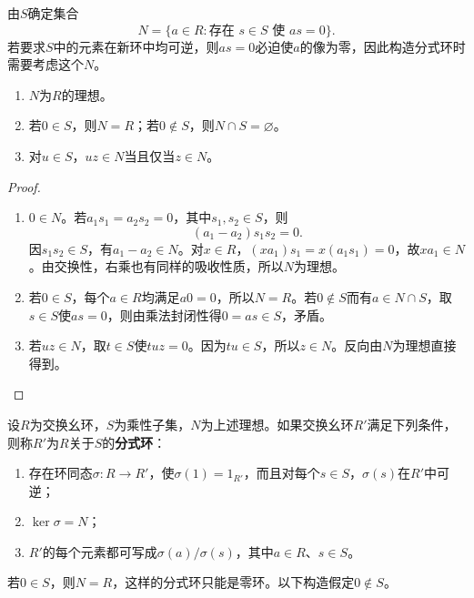 由$S$确定集合
\[
N=\{a\in R:\text{存在 }s\in S\text{ 使 }as=0\}.
\]
若要求$S$中的元素在新环中均可逆，则$as=0$必迫使$a$的像为零，因此构造分式环时需要考虑这个$N$。

\begin{lemma}
\begin{enumerate}
\item $N$为$R$的理想。
\item 若$0\in S$，则$N=R$；若$0\notin S$，则$N\cap S=\varnothing$。
\item 对$u\in S$，$uz\in N$当且仅当$z\in N$。
\end{enumerate}
\end{lemma}
\begin{proof}
\begin{enumerate}
\item $0\in N$。若$a_1s_1=a_2s_2=0$，其中$s_1,s_2\in S$，则
\[
(a_1-a_2)s_1s_2=0.
\]
因$s_1s_2\in S$，有$a_1-a_2\in N$。对$x\in R$，$(xa_1)s_1=x(a_1s_1)=0$，故$xa_1\in N$。由交换性，右乘也有同样的吸收性质，所以$N$为理想。
\item 若$0\in S$，每个$a\in R$均满足$a0=0$，所以$N=R$。若$0\notin S$而有$a\in N\cap S$，取$s\in S$使$as=0$，则由乘法封闭性得$0=as\in S$，矛盾。
\item 若$uz\in N$，取$t\in S$使$tuz=0$。因为$tu\in S$，所以$z\in N$。反向由$N$为理想直接得到。
\end{enumerate}
\end{proof}

\begin{definition}
设$R$为交换幺环，$S$为乘性子集，$N$为上述理想。如果交换幺环$R'$满足下列条件，则称$R'$为$R$关于$S$的\textbf{分式环}：
\begin{enumerate}
\item 存在环同态$\sigma:R\to R'$，使$\sigma(1)=1_{R'}$，而且对每个$s\in S$，$\sigma(s)$在$R'$中可逆；
\item $\ker\sigma=N$；
\item $R'$的每个元素都可写成$\sigma(a)/\sigma(s)$，其中$a\in R$、$s\in S$。
\end{enumerate}
\end{definition}

若$0\in S$，则$N=R$，这样的分式环只能是零环。以下构造假定$0\notin S$。

